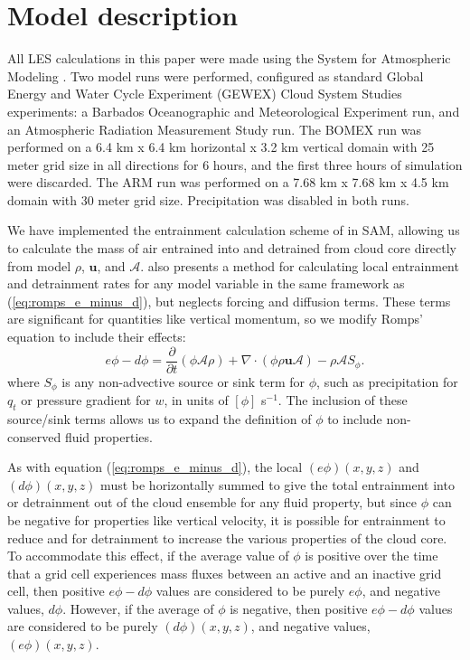 \documentclass[12pt]{article}
\begin{document}

\section{Model description}

All LES calculations in this paper were made using the System for Atmospheric 
Modeling \citep[SAM;][]{Khairoutdinov2003}.  Two model runs were performed, 
configured as standard Global Energy and Water Cycle Experiment (GEWEX) 
Cloud System Studies \citep[GCSS;][]{Randall2003} experiments: a Barbados 
Oceanographic and Meteorological Experiment \citep[BOMEX;][]{Siebesma2003} run,
and an Atmospheric Radiation Measurement Study \citep[ARM;][]{Brown2002} run. 
The BOMEX run was performed on a 6.4 km x 6.4 km horizontal x 3.2 km vertical 
domain with 25 meter grid size in all directions for 6 hours, and the first 
three hours of simulation were discarded. The ARM run was performed on a 
7.68 km x 7.68 km x 4.5 km domain with 30 meter grid size.  Precipitation was 
disabled in both runs.

We have implemented the entrainment calculation scheme of \cite{Romps2010} in 
SAM, allowing us to calculate the mass of air entrained into and detrained from
cloud core directly from model $\rho$, $\mathbf{u}$, and $\mathcal{A}$.  
\citet[eq. 4]{Romps2010} also presents a method for calculating local 
entrainment and detrainment rates for any model variable in the same
framework as (\ref{eq:romps_e_minus_d}), but neglects forcing and diffusion
terms.  These terms are significant for quantities like vertical momentum, so 
we modify Romps' equation to include their effects:
\begin{equation}
  \label{eq:romps_ephi_minus_dphi}
  e\phi - d\phi = \frac{\partial}{\partial t}(\phi \mathcal{A} \rho) 
                + \nabla \cdot (\phi \rho \mathbf{u} \mathcal{A})
                - \rho \mathcal{A}S_\phi.
\end{equation}
where $S_\phi$ is any non-advective source or sink term for $\phi$, such as 
precipitation for $q_t$ or pressure gradient for $w$, in units of $[\phi]$ 
s$^{-1}$.  The inclusion of these source/sink terms allows us to expand the 
definition of $\phi$ to include non-conserved fluid properties.

As with equation (\ref{eq:romps_e_minus_d}), the local $(e\phi)(x,y,z)$
and $(d\phi)(x,y,z)$ must be horizontally summed to give the total entrainment 
into or detrainment out of the cloud ensemble for any fluid property, but
since $\phi$ can be negative for properties like vertical velocity, it is 
possible for entrainment to reduce and for detrainment to increase the 
various properties of the cloud core.  To accommodate this effect, if the 
average value of $\phi$ is positive over the time that a grid cell experiences 
mass fluxes between an active and an inactive grid cell, then positive 
$e\phi-d\phi$ values are considered to be purely $e\phi$, and negative values, 
$d\phi$.  However, if the average of $\phi$ is negative, then positive 
$e\phi-d\phi$ values are considered to be purely $(d\phi)(x,y,z)$, and negative 
values, $(e\phi)(x,y,z)$.
\end{document}
